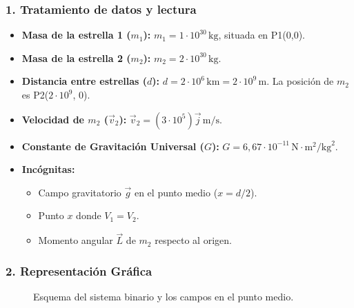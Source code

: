 \subsubsection*{1. Tratamiento de datos y lectura}
\begin{itemize}
    \item \textbf{Masa de la estrella 1 ($m_1$):} $m_1 = 1 \cdot 10^{30} \, \text{kg}$, situada en P1(0,0).
    \item \textbf{Masa de la estrella 2 ($m_2$):} $m_2 = 2 \cdot 10^{30} \, \text{kg}$.
    \item \textbf{Distancia entre estrellas ($d$):} $d = 2 \cdot 10^{6} \, \text{km} = 2 \cdot 10^{9} \, \text{m}$. La posición de $m_2$ es P2($2 \cdot 10^9$, 0).
    \item \textbf{Velocidad de $m_2$ ($\vec{v}_2$):} $\vec{v}_2 = (3 \cdot 10^5) \vec{j} \, \text{m/s}$.
    \item \textbf{Constante de Gravitación Universal ($G$):} $G = 6,67 \cdot 10^{-11} \, \text{N}\cdot\text{m}^2/\text{kg}^2$.
    \item \textbf{Incógnitas:}
    \begin{itemize}
        \item Campo gravitatorio $\vec{g}$ en el punto medio ($x=d/2$).
        \item Punto $x$ donde $V_1 = V_2$.
        \item Momento angular $\vec{L}$ de $m_2$ respecto al origen.
    \end{itemize}
\end{itemize}

\subsubsection*{2. Representación Gráfica}
\begin{figure}[H]
    \centering
    \caption{Esquema del sistema binario y los campos en el punto medio.}
\end{figure}


